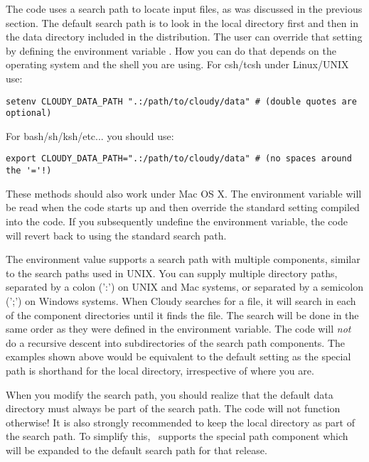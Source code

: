The code uses a search path to locate input files, as was discussed in the
previous section. The default search path is to look in the local directory
first and then in the data directory included in the distribution. The user
can override that setting by defining the environment variable
. How you can do that depends on the operating
system and the shell you are using. For csh/tcsh under Linux/UNIX use:
\begin{verbatim}
setenv CLOUDY_DATA_PATH ".:/path/to/cloudy/data" # (double quotes are optional)
\end{verbatim}
For bash/sh/ksh/etc... you should use:
\begin{verbatim}
export CLOUDY_DATA_PATH=".:/path/to/cloudy/data" # (no spaces around the '='!)
\end{verbatim}
These methods should also work under Mac OS X. The environment variable will
be read when the code starts up and then override the standard setting
compiled into the code. If you subsequently undefine the environment variable,
the code will revert back to using the standard search path.

The environment value  supports a search path
with multiple components, similar to the search paths used in UNIX. You can
supply multiple directory paths, separated by a colon (':') on UNIX and Mac
systems, or separated by a semicolon (';') on Windows systems. When Cloudy
searches for a file, it will search in each of the component directories until
it finds the file. The search will be done in the same order as they were
defined in the environment variable. The code will {\em not} do a recursive
descent into subdirectories of the search path components. The examples shown
above would be equivalent to the default setting as the special path
 is shorthand for the local directory, irrespective of where
you are.

When you modify the search path, you should realize that the default data
directory must always be part of the search path. The code will not function
otherwise! It is also strongly recommended to keep the local directory as part
of the search path. To simplify this, \Cloudy\ supports the special path
component  which will be expanded to the default search path
for that release.

